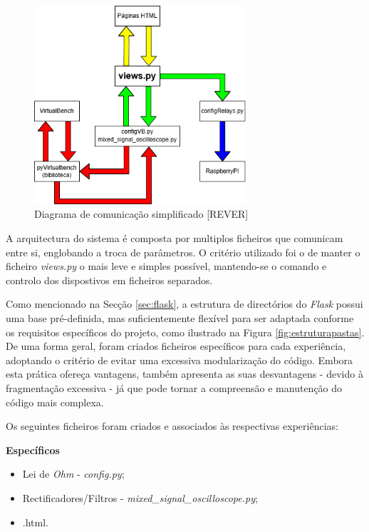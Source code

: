\begin{figure}[hbtp]
	\centering
	\includegraphics[width=0.7\textwidth]{figures/Diagrama_simplificado.drawio.png}
	\caption{Diagrama de comunicação simplificado [REVER]}
	\label{fig:diagramasimplificado}
\end{figure}

A arquitectura do sistema é composta por multiplos ficheiros que comunicam entre si, englobando a troca de parâmetros. O critério utilizado foi o de manter o ficheiro \textit{views.py} o mais leve e simples possível, mantendo-se o comando e controlo dos dispostivos em ficheiros separados.

Como mencionado na Secção \ref{sec:flask}, a estrutura de directórios do \textit{Flask} possui uma base pré-definida, mas suficientemente flexível para ser adaptada conforme os requisitos específicos do projeto, como ilustrado na Figura \ref{fig:estruturapastas}. De uma forma geral, foram criados ficheiros específicos para cada experiência, adoptando o critério de evitar uma excessiva modularização do código. Embora esta prática ofereça vantagens, também apresenta as suas desvantagens - devido à fragmentação excessiva - já que pode tornar a compreensão e manutenção do código mais complexa.

Os seguintes ficheiros foram criados e associados às respectivas experiências:

\textbf{Específicos}
\begin{itemize}
	\item Lei de \textit{Ohm} - \textit{config.py};
	\item Rectificadores/Filtros - \textit{mixed\_signal\_oscilloscope.py};
	\item {}.html.
\end{itemize}

